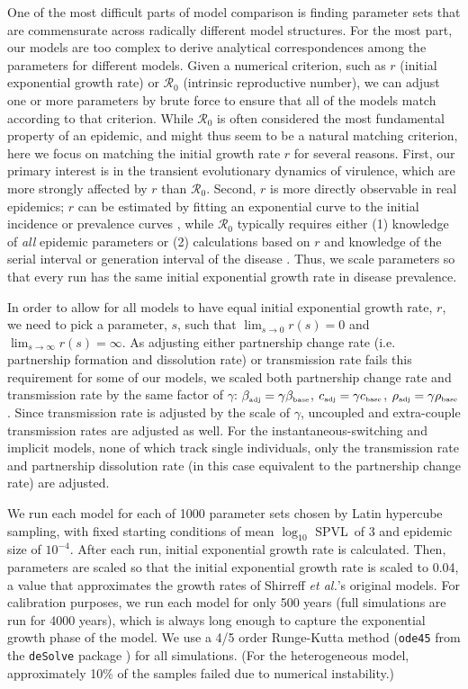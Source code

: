 \documentclass[10pt,letterpaper]{article}
\newcommand{\Lspvl}{$\log_{10}$ SPVL}
\newcommand{\rzero}{{\mathcal R}_0}
\newcommand{\etal}{\textit{et al.}}
\newcommand{\tsub}[2]{#1_{{\textrm{\tiny #2}}}}
\begin{document}
One of the most difficult parts of model comparison is finding
parameter sets that are commensurate across radically different model
structures. For the most part, our models are too complex to
derive analytical correspondences among the parameters
for different models. Given a numerical
criterion, such as $r$ (initial exponential growth rate) or $\rzero$ 
(intrinsic reproductive number), we can adjust one or more
parameters by brute force to ensure that all of the models match
according to that criterion. While $\rzero$ is often considered
the most fundamental property of an epidemic, and might thus seem to
be a natural matching criterion, here we focus on matching the initial
growth rate $r$ for several reasons. First, our primary interest is in
the transient evolutionary dynamics of virulence, which are more
strongly affected by $r$ than $\rzero$. Second, $r$ is 
more directly observable in real epidemics; $r$ can be estimated by
fitting an exponential curve to the initial incidence or
prevalence curves \cite{ma_estimating_2014}, while $\rzero$
typically requires either (1) knowledge of \emph{all} epidemic
parameters or (2) calculations based on
$r$ and knowledge of the serial interval or generation interval of the
disease \cite{wallinga_how_2007}. Thus, we scale parameters so that
every run has the same initial exponential growth rate in 
disease prevalence.

In order to allow for all models to have equal initial exponential
growth rate, $r$, we need to pick a parameter, $s$, such that
$\lim_{s\to 0} r(s) = 0$ and $\lim_{s\to\infty} r(s) = \infty$. As
adjusting either partnership change rate (i.e. partnership formation
and dissolution rate) or transmission rate fails this requirement for
some of our models, we scaled both partnership change rate and
transmission rate by the same factor of $\gamma$: $\tsub{\beta}{adj} =
\gamma \tsub{\beta}{base}$, $\tsub{c}{adj} = \gamma \tsub{c}{base}$,
$\tsub{\rho}{adj} = \gamma \tsub{\rho}{base}$. Since transmission rate
is adjusted by the scale of $\gamma$, uncoupled and extra-couple
transmission rates are adjusted as well. For the instantaneous-switching
and implicit models, none of which track single individuals, 
only the transmission rate and partnership
dissolution rate (in this case equivalent to the partnership change
rate) are adjusted.

We run each model for each of 1000 parameter sets chosen by Latin hypercube sampling, with fixed starting conditions
of mean \Lspvl\ of 3 and epidemic size of $10^{-4}$. After each run, initial exponential growth rate is calculated. Then, parameters are scaled so that the initial exponential growth rate is scaled to 0.04, a value that approximates the growth rates of Shirreff \etal's original models.
For calibration purposes, we run each model for only 500 years
(full simulations are run for 4000 years), which is always long
enough to capture the exponential growth phase of the model. 
We use a 4/5 order 
Runge-Kutta method (\texttt{ode45} from the \texttt{deSolve} package
\cite{soetaert_solving_2010}) for all simulations. 
(For the heterogeneous model, approximately
10\% of the samples failed due to numerical instability.)
\end{document}

